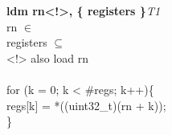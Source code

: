 


\begin{instructionblock}{\imagewidth}%
    \textbf{ldm rn<!>, \{ registers \}}\hfill\textit{T1}\\
    rn $\in$ \baseregisters\\
    registers $\subseteq$ \baseregisters\\
    <!> also load rn\\
    {}\\
    for (k = 0; k < \#regs; k++)\{\\
    regs[k] = *((uint32\_t)(rn + k));\\
    \}
\end{instructionblock}

